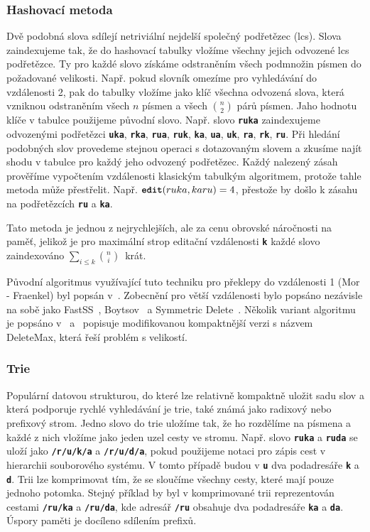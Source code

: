 \documentclass[11pt,letterpaper,oneside,openright]{book}
\newcommand{\bftt}[1]{\texttt{\textbf{#1}}}
\begin{document}
\subsubsection{Hashovací metoda}
Dvě podobná slova sdílejí netriviální nejdelší společný podřetězec (lcs). Slova
zaindexujeme tak, že do hashovací tabulky vložíme všechny jejich odvozené lcs
podřetězce. Ty pro každé slovo získáme odstraněním všech podmnožin písmen do
požadované velikosti. Např. pokud slovník omezíme pro vyhledávání do
vzdálenosti 2, pak do tabulky vložíme jako klíč všechna odvozená slova, která
vzniknou odstraněním všech $n$ písmen a všech ${n \choose 2}$ párů písmen. Jaho
hodnotu klíče v tabulce použijeme původní slovo. Např. slovo \bftt{ruka}
zaindexujeme odvozenými podřetězci \bftt{uka}, \bftt{rka}, \bftt{rua},
\bftt{ruk}, \bftt{ka}, \bftt{ua}, \bftt{uk}, \bftt{ra}, \bftt{rk}, \bftt{ru}.
Při hledání podobných slov provedeme stejnou operaci s dotazovaným slovem a
zkusíme najít shodu v tabulce pro každý jeho odvozený podřetězec. Každý
nalezený zásah prověříme vypočtením vzdálenosti klasickým tabulkým algoritmem,
protože tahle metoda může přestřelit. Např. $\bftt{edit}(ruka, karu) = 4$,
přestože by došlo k zásahu na podřetězcích \bftt{ru} a \bftt{ka}.

Tato metoda je jednou z nejrychlejších, ale za cenu obrovské náročnosti na
paměť, jelikož je pro maximální strop editační vzdálenosti \bftt{k} každé slovo
zaindexováno $\sum_{i \leq k} {n \choose i}$~krát.

Původní algoritmus  využívající tuto techniku pro překlepy do vzdálenosti 1
(Mor - Fraenkel) byl popsán v~\cite{Mor:1982:HCM:358728.358752}. Zobecnění pro
větší vzdálenosti bylo popsáno nezávisle na sobě jako FastSS~\cite{FastSS},
Boytsov~\cite{Boytsov:2011:IMA:1963190.1963191} a Symmetric
Delete~\cite{Faroo_symmetric_delete}. Několik variant algoritmu je popsáno
v~\cite{FastSS} a~\cite{Bast:2013:EFS:2457465.2457470} popisuje modifikovanou
kompaktnější verzi s názvem DeleteMax, která řeší problém s velikostí.

\subsubsection{Trie}
Populární datovou strukturou, do které lze relativně kompaktně uložit sadu slov
a která podporuje rychlé vyhledávání je trie, také známá jako radixový nebo
prefixový strom. Jedno slovo do trie uložíme tak, že ho rozdělíme na písmena a
každé z nich vložíme jako jeden uzel cesty ve stromu. Např. slovo \bftt{ruka} a
\bftt{ruda} se uloží jako \bftt{/r/u/k/a} a \bftt{/r/u/d/a}, pokud použijeme
notaci pro zápis cest v hierarchii souborového systému. V tomto případě budou v
 \bftt{u} dva podadresáře \bftt{k} a \bftt{d}. Trii lze
komprimovat tím, že se sloučíme všechny cesty, které mají pouze jednoho
potomka. Stejný příklad by byl v komprimované trii reprezentován cestami
\bftt{/ru/ka} a \bftt{/ru/da}, kde adresář \bftt{/ru} obsahuje dva podadresáře
\bftt{ka} a \bftt{da}. Úspory paměti je docíleno sdílením prefixů.
\end{document}
